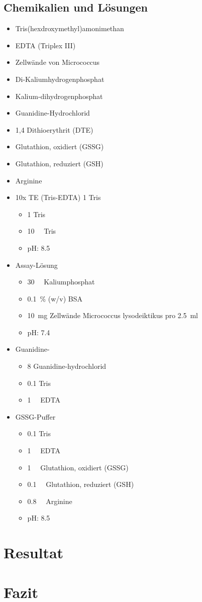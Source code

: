 \documentclass[a4paper,german]{scrreprt}
\begin{document}
\section{Chemikalien und Lösungen}

\begin{itemize}
	\item Tris(hexdroxymethyl)amonimethan
	\item EDTA (Triplex III)
	\item Zellwände von Micrococcus
	\item Di-Kaliumhydrogenphosphat
	\item Kalium-dihydrogenphosphat
	\item Guanidine-Hydrochlorid
	\item 1,4 Dithioerythrit (DTE)
	\item Glutathion, oxidiert (GSSG)
	\item Glutathion, reduziert (GSH)
	\item Arginine

	\item 10x TE (Tris-EDTA) \SI{1}{\Molar} Tris
	\begin{itemize}
		\item \SI{1}{\Molar} Tris
		\item \SI{10}{\milli\Molar} Tris
		\item pH: 8.5
	\end{itemize}

	\item Assay-Lösung
	\begin{itemize}
		\item \SI{30}{\milli\Molar} Kaliumphosphat
		\item \SI{0.1}{\percent} (w/v) BSA
		\item \SI{10}{mg} Zellwände Micrococcus lysodeiktikus pro \SI{2.5}{ml}
		\item pH: 7.4
	\end{itemize}

	\item Guanidine-
	\begin{itemize}
		\item \SI{8}{\Molar} Guanidine-hydrochlorid
		\item \SI{0.1}{\Molar} Tris
		\item \SI{1}{\milli\Molar} EDTA
	\end{itemize}
	\item GSSG-Puffer
	\begin{itemize}
		\item \SI{0.1}{\Molar} Tris
		\item \SI{1}{\milli\Molar} EDTA
		\item \SI{1}{\milli\Molar} Glutathion, oxidiert (GSSG)
		\item \SI{0.1}{\milli\Molar} Glutathion, reduziert (GSH)
		\item \SI{0.8}{\milli\Molar} Arginine
		\item pH: 8.5
	\end{itemize}
\end{itemize}



\chapter{Resultat}

\chapter{Fazit}
\end{document}

